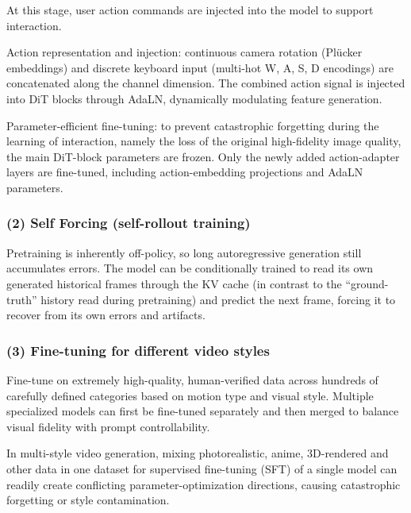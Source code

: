 At this stage, user action commands are injected into the model to support interaction.

Action representation and injection: continuous camera rotation (Plücker embeddings) and discrete keyboard input (multi-hot W, A, S, D encodings) are concatenated along the channel dimension. The combined action signal is injected into DiT blocks through AdaLN, dynamically modulating feature generation.

Parameter-efficient fine-tuning: to prevent catastrophic forgetting during the learning of interaction, namely the loss of the original high-fidelity image quality, the main DiT-block parameters are frozen. Only the newly added action-adapter layers are fine-tuned, including action-embedding projections and AdaLN parameters.

\hypertarget{self-forcing-self-rollout-training}{%
\subsubsection{(2) Self Forcing (self-rollout training)}\label{self-forcing-self-rollout-training}}

Pretraining is inherently off-policy, so long autoregressive generation still accumulates errors. The model can be conditionally trained to read its own generated historical frames through the KV cache (in contrast to the ``ground-truth'' history read during pretraining) and predict the next frame, forcing it to recover from its own errors and artifacts.

\hypertarget{fine-tuning-for-different-video-styles}{%
\subsubsection{(3) Fine-tuning for different video styles}\label{fine-tuning-for-different-video-styles}}

Fine-tune on extremely high-quality, human-verified data across hundreds of carefully defined categories based on motion type and visual style. Multiple specialized models can first be fine-tuned separately and then merged to balance visual fidelity with prompt controllability.

In multi-style video generation, mixing photorealistic, anime, 3D-rendered and other data in one dataset for supervised fine-tuning (SFT) of a single model can readily create conflicting parameter-optimization directions, causing catastrophic forgetting or style contamination.

